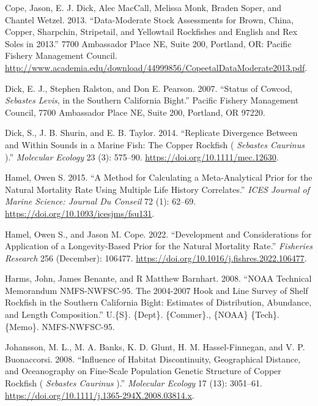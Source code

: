 \documentclass[11pt,
  english,
  letterpaper,
]{article}
\newlength{\cslhangindent}
\newenvironment{CSLReferences}[2] %
 {%
  \setlength{\parindent}{0pt}
  \ifodd #1 \everypar{\setlength{\hangindent}{\cslhangindent}}\ignorespaces\fi
  \ifnum #2 > 0
  \setlength{\parskip}{#2\baselineskip}
  \fi
 }%
 {}
\begin{document}
\begin{CSLReferences}{1}{0}
\leavevmode{}%
Cope, Jason, E. J. Dick, Alec MacCall, Melissa Monk, Braden Soper, and Chantel Wetzel. 2013. {``Data-Moderate Stock Assessments for Brown, {China}, Copper, Sharpchin, Stripetail, and Yellowtail Rockfishes and {English} and Rex Soles in 2013.''} 7700 Ambassador Place NE, Suite 200, Portland, OR: Pacific Fishery Management Council. \url{http://www.academia.edu/download/44999856/CopeetalDataModerate2013.pdf}.

\leavevmode{}%
Dick, E. J., Stephen Ralston, and Don E. Pearson. 2007. {``Status of Cowcod, \emph{{Sebastes} Levis}, in the {Southern} {California} {Bight}.''} Pacific Fishery Management Council, 7700 Ambassador Place NE, Suite 200, Portland, OR 97220.

\leavevmode{}%
Dick, S., J. B. Shurin, and E. B. Taylor. 2014. {``Replicate Divergence Between and Within Sounds in a Marine Fish: The Copper Rockfish ( \emph{{Sebastes} Caurinus} ).''} \emph{Molecular Ecology} 23 (3): 575--90. \url{https://doi.org/10.1111/mec.12630}.

\leavevmode{}%
Hamel, Owen S. 2015. {``A Method for Calculating a Meta-Analytical Prior for the Natural Mortality Rate Using Multiple Life History Correlates.''} \emph{ICES Journal of Marine Science: Journal Du Conseil} 72 (1): 62--69. \url{https://doi.org/10.1093/icesjms/fsu131}.

\leavevmode{}%
Hamel, Owen S., and Jason M. Cope. 2022. {``Development and Considerations for Application of a Longevity-Based Prior for the Natural Mortality Rate.''} \emph{Fisheries Research} 256 (December): 106477. \url{https://doi.org/10.1016/j.fishres.2022.106477}.

\leavevmode{}%
Harms, John, James Benante, and R Matthew Barnhart. 2008. {``{NOAA} {Technical} {Memorandum} {NMFS}-{NWFSC}-95. {The} 2004-2007 {Hook} and {Line} {Survey} of {Shelf} {Rockfish} in the {Southern} {California} {Bight}: {Estimates} of {Distribution}, {Abundance}, and {Length} {Composition}.''} U.\{S\}. \{Dept\}. \{Commer\}., \{NOAA\} \{Tech\}. \{Memo\}. NMFS-NWFSC-95.

\leavevmode{}%
Johansson, M. L., M. A. Banks, K. D. Glunt, H. M. Hassel-Finnegan, and V. P. Buonaccorsi. 2008. {``Influence of Habitat Discontinuity, Geographical Distance, and Oceanography on Fine-Scale Population Genetic Structure of Copper Rockfish ( \emph{{Sebastes} Caurinus} ).''} \emph{Molecular Ecology} 17 (13): 3051--61. \url{https://doi.org/10.1111/j.1365-294X.2008.03814.x}.


\end{CSLReferences}
\end{document}
